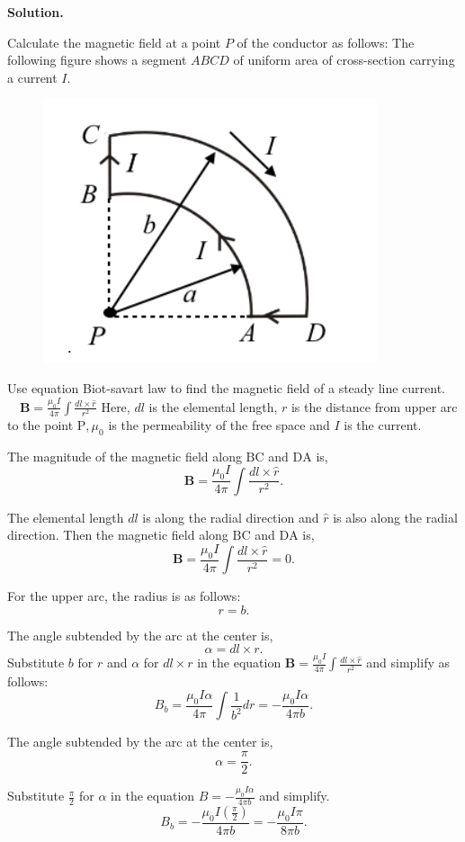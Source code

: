\documentclass[12pt, a4paper, oneside]{report}
\newenvironment{solution}{
  \par\medskip\noindent
  \textbf{Solution.}\quad\itshape
  \par\noindent\makebox[\linewidth]{\rule{\textwidth}{0.4pt}}
}{
  \par\noindent\makebox[\linewidth]{\rule{\textwidth}{0.4pt}}
  \par\medskip
}
\begin{document}
\begin{solution}
Calculate the magnetic field at a point $P$ of the conductor as follows:
The following figure shows a segment $A B C D$ of uniform area of cross-section carrying a current $I$.

\begin{figure}[ht!]
    \centering
    \includegraphics[width=0.5\linewidth]{5.png}
    \caption{}
    \label{fig:enter-label}
\end{figure}

Use equation Biot-savart law to find the magnetic field of a steady line current. $\quad \mathbf{B}=\frac{\mu_0 I}{4 \pi} \int \frac{d l \times \hat{r}}{r^2}$
Here, $d l$ is the elemental length, $r$ is the distance from upper arc to the point $\mathrm{P}, \mu_0$ is the permeability of the free space and $I$ is the current.

The magnitude of the magnetic field along $\mathrm{BC}$ and $\mathrm{DA}$ is,
$$
\mathbf{B}=\frac{\mu_0 I}{4 \pi} \int \frac{d l \times \hat{r}}{r^2}.
$$

The elemental length $d l$ is along the radial direction and $\hat{r}$ is also along the radial direction. Then the magnetic field along $\mathrm{BC}$ and $\mathrm{DA}$ is,
$$
\mathbf{B} =\frac{\mu_0 I}{4 \pi} \int \frac{d l \times \hat{r}}{r^2}  =0.
$$

For the upper arc, the radius is as follows:
$$
r=b.
$$

The angle subtended by the arc at the center is,
$$
\alpha=d l \times r.
$$
Substitute $b$ for $r$ and $\alpha$ for $d l \times r$ in the equation $\mathbf{B}=\frac{\mu_0 I}{4 \pi} \int \frac{d l \times \hat{r}}{r^2}$ and simplify as follows:
$$
B_b  =\frac{\mu_0 I \alpha}{4 \pi} \int \frac{1}{b^2} d r  =-\frac{\mu_0 I \alpha}{4 \pi b}.
$$

The angle subtended by the arc at the center is,
$$
\alpha=\frac{\pi}{2}.
$$

Substitute $\frac{\pi}{2}$ for $\alpha$ in the equation $B=-\frac{\mu_0 I \alpha}{4 \pi b}$ and simplify.
$$
B_b =-\frac{\mu_0 I\left(\frac{\pi}{2}\right)}{4 \pi b} =-\frac{\mu_0 I \pi}{8 \pi b}.
$$


\end{solution}
\end{document}
